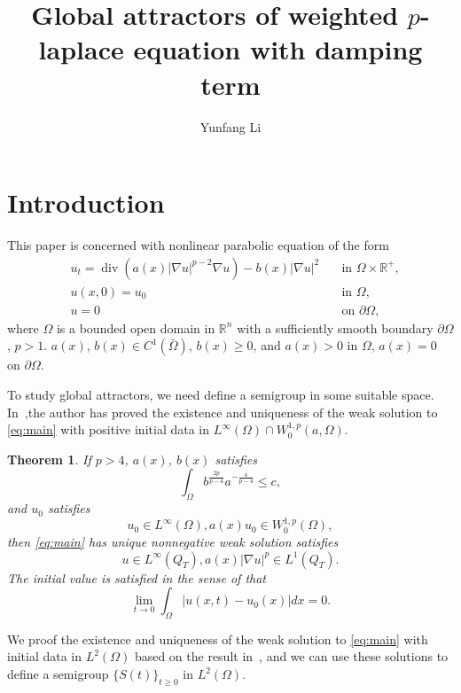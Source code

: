 \documentclass[11pt]{amsart}
\title[Attractor of $p$-laplace equation]{Global attractors of weighted $p$-laplace equation with damping term}
\author[Y. Li]{Yunfang Li}
\newtheorem{theorem}{Theorem}[section]
\theoremstyle{definition}
\numberwithin{equation}{section}
\newcommand*\abs[1]{\lvert#1\rvert}
\newcommand*\Brace[1]{\lbrace#1\rbrace}
\newcommand\R{\mathbb{R}}
\DeclareMathOperator{\Div}{div}
\begin{document}
\begin{abstract}
\end{abstract}

\maketitle

\section{Introduction}
This paper is concerned with nonlinear parabolic equation of the form
\begin{equation}\label{eq:main}
\begin{alignedat}{2}
& u_t = \Div(a(x)\abs{\nabla u}^{p-2}\nabla u) - b(x)\abs{\nabla u}^2 \quad &\text{in } \Omega \times \R^+,\\
& u(x,0) = u_0 \quad &\text{in } \Omega,\\
& u = 0 \quad &\text{on } \partial\Omega,
\end{alignedat}
\end{equation}
where $\Omega$ is a bounded open domain in $\R^{n}$ with a sufficiently smooth boundary $\partial\Omega$, $p>1$.
$ a(x)$, $b(x) \in C^1(\bar{\Omega}) $, $b(x) \geq 0$, and $a(x) > 0$ in $\Omega$, $a(x) = 0$ on $\partial\Omega$.

To study global attractors, we need define a semigroup in some suitable space.
In~\cite{Zhan2019Uniquenessa},the author has proved the existence and uniqueness of the weak
solution to \cref{eq:main} with positive initial data in
$L^{\infty}(\Omega) \cap W_0^{1,p}(a,\Omega) $.
\begin{theorem}
	If $p>4$, $a(x)$, $b(x)$ satisfies
	\begin{equation}
		\int_{\Omega} b^{\frac{2p}{p-4}}a^{-\frac{4}{p-4}} \leq c,
	\end{equation}
	and $u_0$ satisfies
	\begin{equation}
		u_0 \in L^{\infty}(\Omega), a(x)u_0 \in W_0^{1,p}(\Omega),
	\end{equation}
	then \cref{eq:main} has unique nonnegative weak solution satisfies
	\begin{equation}
		u \in L^{\infty}(Q_T), a(x)\abs{\nabla u}^p \in L^1(Q_T).
	\end{equation}
	The initial value is satisfied in the sense of that
	\begin{equation}
		\lim_{t \to 0}\int_{\Omega}\abs{u(x,t) - u_0(x)}dx = 0.
	\end{equation}
\end{theorem}
We proof the existence and
uniqueness of the weak solution to \cref{eq:main} with initial data in
$L^2(\Omega) $ based on the result in~\cite{Zhan2019Uniquenessa}, and we can use
these solutions to define a semigroup $\Brace{S(t)}_{t \geq 0} $ in $L^2(\Omega) $.
\end{document}
